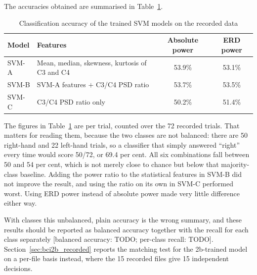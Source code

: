 The accuracies obtained are summarised in Table~\ref{tab:svm_accuracy}.

\begin{table}[h]
\centering
\caption{Classification accuracy of the trained SVM models on the recorded data}
\label{tab:svm_accuracy}
\begin{tabular}{|l|p{5.6cm}|c|c|}
\hline
\textbf{Model} & \textbf{Features} & \textbf{Absolute power} & \textbf{ERD power} \\
\hline
SVM-A & Mean, median, skewness, kurtosis of C3 and C4 & 53.9\% & 53.1\% \\
\hline
SVM-B & SVM-A features $+$ C3/C4 PSD ratio & 53.7\% & 53.5\% \\
\hline
SVM-C & C3/C4 PSD ratio only & 50.2\% & 51.4\% \\
\hline
\end{tabular}
\end{table}

The figures in Table~\ref{tab:svm_accuracy} are per trial, counted over the 72 recorded
trials. That matters for reading them, because the two classes are not balanced: there are
50 right-hand and 22 left-hand trials, so a classifier that simply answered ``right'' every
time would score 50/72, or 69.4 per cent. All six combinations fall between 50 and 54 per
cent, which is not merely close to chance but below that majority-class baseline. Adding
the power ratio to the statistical features in SVM-B did not improve the result, and using
the ratio on its own in SVM-C performed worst. Using ERD power instead of absolute power
made very little difference either way.

With classes this unbalanced, plain accuracy is the wrong summary, and these results
should be reported as balanced accuracy together with the recall for each class
separately [balanced accuracy: TODO; per-class recall: TODO]. Section~\ref{sec:bci2b_recorded}
reports the matching test for the 2b-trained model on a per-file basis instead, where the
15 recorded files give 15 independent decisions.

